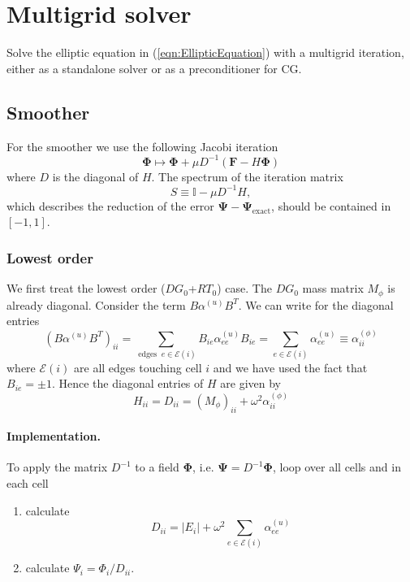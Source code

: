 \documentclass[12pt]{article}
\renewcommand{\vec}[1]{\boldsymbol{#1}}
\begin{document}
\section{Multigrid solver}
Solve the elliptic equation in (\ref{eqn:EllipticEquation}) with a multigrid iteration, either as a standalone solver or as a preconditioner for CG.
\subsection{Smoother}
For the smoother we use the following Jacobi iteration
\begin{equation}
  \vec{\Phi} \mapsto \vec{\Phi} + \mu D^{-1} \left(\vec{F}-H\vec{\Phi}\right)
  \label{eqn:Richardson}
\end{equation}
where $D$ is the diagonal of $H$. The spectrum of the iteration matrix 
\begin{equation}
  S \equiv \mathbb{I} - \mu D^{-1} H,
\end{equation}
which describes the reduction of the error $\vec{\Psi}-\vec{\Psi}_{\operatorname{exact}}$, should be contained in $[-1,1]$.
\subsubsection{Lowest order}
We first treat the lowest order ($DG_0$+$RT_0$) case.
The $DG_0$ mass matrix $M_\phi$ is already diagonal. Consider the term $B\alpha^{(u)} B^T$. We can write for the diagonal entries
\begin{equation}
  (B \alpha^{(u)} B^T)_{ii} = \sum_{\operatorname{edges}\;e\in\mathcal{E}(i)} B_{ie} \alpha^{(u)}_{ee} B_{ie}
= \sum_{e\in\mathcal{E}(i)} \alpha_{ee}^{(u)} \equiv \alpha_{ii}^{(\phi)}
\label{eqn:MatrixBound}
\end{equation}
where $\mathcal{E}(i)$ are all edges touching cell $i$ and we have used the fact that $B_{ie}=\pm 1$. Hence the diagonal entries of $H$ are given by 
\begin{equation}
  H_{ii} = D_{ii} = \left(M_{\phi}\right)_{ii} + \omega^2 \alpha^{(\phi)}_{ii}
\label{eqn:blockSmootherLO}
\end{equation}
\paragraph{Implementation.}
To apply the matrix $D^{-1}$ to a field $\vec{\Phi}$, i.e. $\vec{\Psi}=D^{-1}\vec{\Phi}$, loop over all cells and in each cell
\begin{enumerate}
  \item calculate
\begin{equation}
  D_{ii} = |E_i| + \omega^2 \sum_{e\in \mathcal{E}(i)} \alpha^{(u)}_{ee}
\end{equation}
  \item calculate $\Psi_i = \Phi_i/D_{ii}$.
\end{enumerate}
\end{document}
